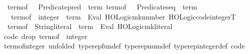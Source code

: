 \begin{isabellebody}
\ \ {\isachardoublequoteopen}term{\isacharunderscore}{\kern0pt}of\ {\isacharcolon}{\kern0pt}{\isacharcolon}{\kern0pt}\ {\isacharunderscore}{\kern0pt}\ Predicate{\isachardot}{\kern0pt}pred\ {\isasymRightarrow}\ term{\isachardoublequoteclose}\ {\isachardoublequoteopen}term{\isacharunderscore}{\kern0pt}of\ {\isacharcolon}{\kern0pt}{\isacharcolon}{\kern0pt}\ {\isacharunderscore}{\kern0pt}\ Predicate{\isachardot}{\kern0pt}seq\ {\isasymRightarrow}\ term{\isachardoublequoteclose}{\isacharbrackright}{\kern0pt}{\isacharbrackright}{\kern0pt}\isanewline
\isanewline
{}\isamarkupfalse%
\isanewline
\ \ \ {\isachardoublequoteopen}term{\isacharunderscore}{\kern0pt}of\ {\isacharcolon}{\kern0pt}{\isacharcolon}{\kern0pt}\ integer\ {\isasymRightarrow}\ term{\isachardoublequoteclose}\ {\isasymrightharpoonup}\ {\isacharparenleft}{\kern0pt}Eval{\isacharparenright}{\kern0pt}\ {\isachardoublequoteopen}HOLogic{\isachardot}{\kern0pt}mk{\isacharprime}{\kern0pt}{\isacharunderscore}{\kern0pt}number{\isacharslash}{\kern0pt}\ HOLogic{\isachardot}{\kern0pt}code{\isacharprime}{\kern0pt}{\isacharunderscore}{\kern0pt}integerT{\isachardoublequoteclose}\isanewline
{\isacharbar}{\kern0pt}\ \ {\isachardoublequoteopen}term{\isacharunderscore}{\kern0pt}of\ {\isacharcolon}{\kern0pt}{\isacharcolon}{\kern0pt}\ String{\isachardot}{\kern0pt}literal\ {\isasymRightarrow}\ term{\isachardoublequoteclose}\ {\isasymrightharpoonup}\ {\isacharparenleft}{\kern0pt}Eval{\isacharparenright}{\kern0pt}\ {\isachardoublequoteopen}HOLogic{\isachardot}{\kern0pt}mk{\isacharprime}{\kern0pt}{\isacharunderscore}{\kern0pt}literal{\isachardoublequoteclose}\isanewline
\isanewline
{}\isamarkupfalse%
\ {\isacharbrackleft}{\kern0pt}{\isacharbrackleft}{\kern0pt}code\ drop{\isacharcolon}{\kern0pt}\ {\isachardoublequoteopen}term{\isacharunderscore}{\kern0pt}of\ {\isacharcolon}{\kern0pt}{\isacharcolon}{\kern0pt}\ integer\ {\isasymRightarrow}\ {\isacharunderscore}{\kern0pt}{\isachardoublequoteclose}{\isacharbrackright}{\kern0pt}{\isacharbrackright}{\kern0pt}\isanewline
\isanewline
{}\isamarkupfalse%
\ term{\isacharunderscore}{\kern0pt}of{\isacharunderscore}{\kern0pt}integer\ {\isacharbrackleft}{\kern0pt}unfolded\ typerep{\isacharunderscore}{\kern0pt}fun{\isacharunderscore}{\kern0pt}def\ typerep{\isacharunderscore}{\kern0pt}num{\isacharunderscore}{\kern0pt}def\ typerep{\isacharunderscore}{\kern0pt}integer{\isacharunderscore}{\kern0pt}def{\isacharcomma}{\kern0pt}\ code{\isacharbrackright}{\kern0pt}{\isacharcolon}{\kern0pt}\isanewline

\end{isabellebody}

